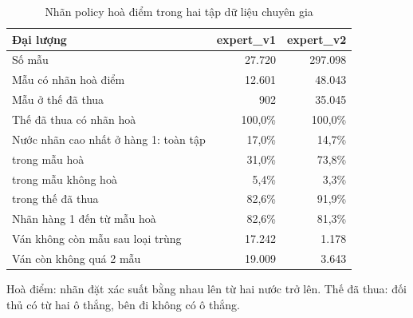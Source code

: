 \begin{table}[H]
  \centering
  \small
  \caption{Nhãn policy hoà điểm trong hai tập dữ liệu chuyên gia}
  \label{tab:cs-dl-hoadiem}
  \begin{tabular}{lrr}
    \toprule
    Đại lượng & expert\_v1 & expert\_v2 \\
    \midrule
    Số mẫu & 27.720 & 297.098 \\
    Mẫu có nhãn hoà điểm & 12.601 & 48.043 \\
    Mẫu ở thế đã thua & 902 & 35.045 \\
    Thế đã thua có nhãn hoà & 100,0\% & 100,0\% \\
    Nước nhãn cao nhất ở hàng 1: toàn tập & 17,0\% & 14,7\% \\
    \quad trong mẫu hoà & 31,0\% & 73,8\% \\
    \quad trong mẫu không hoà & 5,4\% & 3,3\% \\
    \quad trong thế đã thua & 82,6\% & 91,9\% \\
    Nhãn hàng 1 đến từ mẫu hoà & 82,6\% & 81,3\% \\
    Ván không còn mẫu sau loại trùng & 17.242 & 1.178 \\
    Ván còn không quá 2 mẫu & 19.009 & 3.643 \\
    \bottomrule
  \end{tabular}
  \par\smallskip\parbox{.95\linewidth}{\footnotesize Hoà điểm: nhãn đặt xác suất bằng nhau lên từ hai nước trở lên. Thế đã thua: đối thủ có từ hai ô thắng, bên đi không có ô thắng.}
\end{table}
